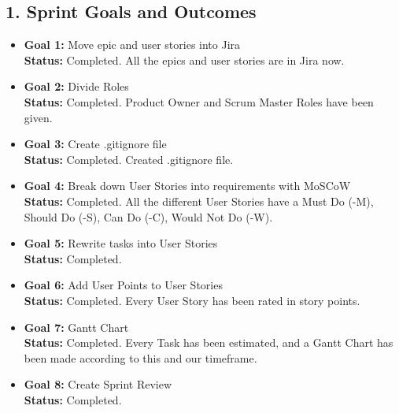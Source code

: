 \documentclass[12pt]{report}
\begin{document}
\subsection*{1. Sprint Goals and Outcomes}

\begin{itemize}
    \item \textbf{Goal 1:} Move epic and user stories into Jira\\
    \textbf{Status:} Completed. All the epics and user stories are in Jira now.
    \item \textbf{Goal 2:} Divide Roles\\
    \textbf{Status:} Completed. Product Owner and Scrum Master Roles have been given.
    \item \textbf{Goal 3:} Create .gitignore file\\
    \textbf{Status:} Completed. Created .gitignore file.
    \item \textbf{Goal 4:} Break down User Stories into requirements with MoSCoW\\
    \textbf{Status:} Completed. All the different User Stories have a Must Do (-M), Should Do (-S), Can Do (-C), Would Not Do (-W).
    \item \textbf{Goal 5:} Rewrite tasks into User Stories\\
    \textbf{Status:} Completed.
    \item \textbf{Goal 6:} Add User Points to User Stories\\
    \textbf{Status:} Completed. Every User Story has been rated in story points.
    \item \textbf{Goal 7:} Gantt Chart\\
    \textbf{Status:} Completed. Every Task has been estimated, and a Gantt Chart has been made according to this and our timeframe.
    \item \textbf{Goal 8:} Create Sprint Review\\
    \textbf{Status:} Completed.
\end{itemize}
\end{document}
